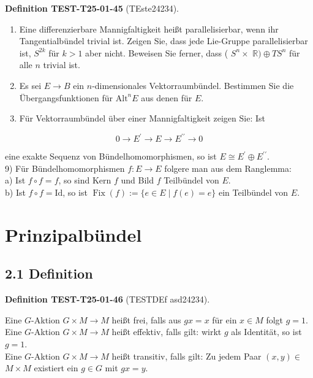 \documentclass[10pt, letterpaper]{article}
\newcommand{\CustomHeading}[3]{%
  \par\medskip\noindent%
  \textbf{#1 #2} \textnormal{(#3)}.\enskip%
}
\newenvironment{DEF}[2]{\begin{unitbox}\CustomHeading{Definition}{#1}{#2}}{\end{unitbox}}
\begin{document}
\begin{DEF}{TEST-T25-01-45}{TEste24234}
\begin{enumerate}
b) Zeigen Sie: Eine differenzierbare Mannigfaltigkeit besitzt genau dann eine Metrik vom Index $n-k$, wenn TM eine $O(k, n-k)$-Bündelstruktur hat.
  \item Eine differenzierbare Mannigfaltigkeit heißt parallelisierbar, wenn ihr Tangentialbündel trivial ist. Zeigen Sie, dass jede Lie-Gruppe parallelisierbar ist, $S^{2 k}$ für $k>1$ aber nicht. Beweisen Sie ferner, dass ( $S^{n} \times$ $\mathbb{R}) \oplus T S^{n}$ für alle $n$ trivial ist.
  \item Es sei $E \rightarrow B$ ein $n$-dimensionales Vektorraumbündel. Bestimmen Sie die Übergangsfunktionen für $\mathrm{Alt}^{n} E$ aus denen für $E$.
  \item Für Vektorraumbündel über einer Mannigfaltigkeit zeigen Sie: Ist
\end{enumerate}
\end{DEF}

$$
0 \rightarrow E^{\prime} \rightarrow E \rightarrow E^{\prime \prime} \rightarrow 0
$$

eine exakte Sequenz von Bündelhomomorphismen, so ist $E \cong E^{\prime} \oplus E^{\prime \prime}$.\\
9) Für Bündelhomomorphismen $f: E \rightarrow E$ folgere man aus dem Ranglemma:\\
a) Ist $f \circ f=f$, so sind Kern $f$ und Bild $f$ Teilbündel von $E$.\\
b) Ist $f \circ f=\mathrm{Id}$, so ist $\operatorname{Fix}(f):=\{e \in E \mid f(e)=e\}$ ein Teilbündel von $E$.



\pagebreak

\section{Prinzipalbündel}
\subsection*{2.1 Definition}
\begin{DEF}{TEST-T25-01-46}{TESTDEf asd24234}
Eine $G$-Aktion $G \times M \rightarrow M$ heißt frei, falls aus $g x=x$ für ein $x \in M$ folgt $g=1$.\\
Eine $G$-Aktion $G \times M \rightarrow M$ heißt effektiv, falls gilt: wirkt $g$ als Identität, so ist $g=1$.\\
Eine $G$-Aktion $G \times M \rightarrow M$ heißt transitiv, falls gilt: Zu jedem Paar $(x, y) \in$ $M \times M$ existiert ein $g \in G$ mit $g x=y$.
\end{DEF}
\end{document}
